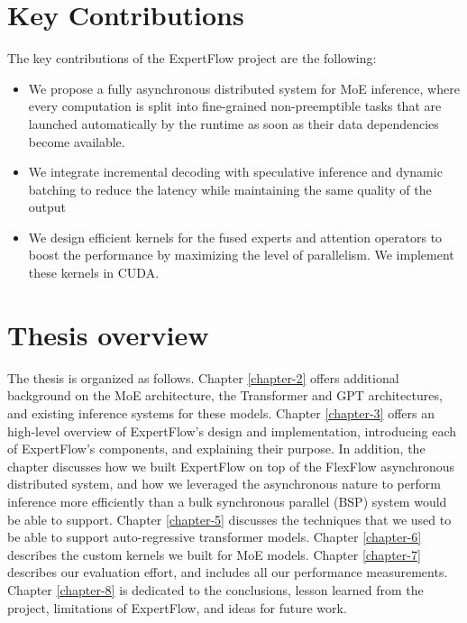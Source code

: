 \section{Key Contributions}
\noindent The key contributions of the ExpertFlow project are the following:
\begin{itemize}
    \item We propose a fully asynchronous distributed system for MoE inference, where every computation is split into fine-grained non-preemptible tasks that are launched automatically by the runtime as soon as their data dependencies become available.
    \item We integrate incremental decoding with speculative inference and dynamic batching to reduce the latency while maintaining the same quality of the output
    \item We design efficient kernels for the fused experts and attention operators to boost the performance by maximizing the level of parallelism. We implement these kernels in CUDA.
\end{itemize}

\section{Thesis overview}
The thesis is organized as follows. Chapter \ref{chapter-2} offers additional background on the MoE architecture, the Transformer and GPT architectures, and existing inference systems for these models. Chapter \ref{chapter-3} offers an high-level overview of ExpertFlow's design and implementation, introducing each of ExpertFlow's components, and explaining their purpose. In addition, the chapter discusses how we built ExpertFlow on top of the FlexFlow asynchronous distributed system, and how we leveraged the asynchronous nature to perform inference more efficiently than a bulk synchronous parallel (BSP) system would be able to support. Chapter \ref{chapter-5} discusses the techniques that we used to be able to support auto-regressive transformer models.  Chapter \ref{chapter-6} describes the custom kernels we built for MoE models. Chapter \ref{chapter-7} describes our evaluation effort, and includes all our performance measurements. Chapter \ref{chapter-8} is dedicated to the conclusions, lesson learned from the project, limitations of ExpertFlow, and ideas for future work. 
